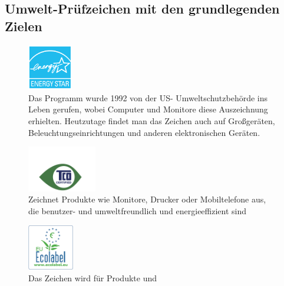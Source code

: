 \documentclass[a4paper]{article}
\begin{document}
    \subsection{\color{red}Umwelt-Prüfzeichen mit den grundlegenden Zielen}\label{subsec:umwelt-prüfzeichen-mit-den-grundlegenden-zielen}
        \begin{multicols}{2}
            \begin{figure}[H]
                \centering
                \includegraphics[height=2cm]{media/estar}
                \captionsetup{labelformat=empty}
                \caption{\color{orange} Das Programm wurde 1992 von der US-
                Umweltschutzbehörde ins Leben gerufen,
                    wobei Computer und Monitore diese
                    Auszeichnung erhielten. Heutzutage findet
                    man das Zeichen auch auf Großgeräten,
                    Beleuchtungseinrichtungen und anderen
                    elektronischen Geräten.}
                \label{fig:estar}
            \end{figure}
            \begin{figure}[H]
                \centering
                \includegraphics[height=2cm]{media/tco-certified}
                \captionsetup{labelformat=empty}
                \caption{\color{orange}Zeichnet Produkte wie Monitore,
                    Drucker oder Mobiltelefone aus, die
                    benutzer- und umweltfreundlich und
                    energieeffizient sind}
                \label{fig:tco}
            \end{figure}
            \begin{figure}[H]
                \centering
                \includegraphics[height=2cm]{media/ECOLABEL}
                \captionsetup{labelformat=empty}
                \caption{\color{orange}Das Zeichen wird für Produkte und
}
\end{figure}
\end{multicols}
\end{document}
